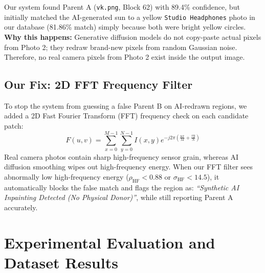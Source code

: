 \documentclass[12pt,a4paper]{article}
\begin{document}
Our system found Parent A (\texttt{vk.png}, Block 62) with 89.4\% confidence, but initially matched the AI-generated sun to a yellow \texttt{Studio Headphones} photo in our database (81.86\% match) simply because both were bright yellow circles. \textbf{Why this happens:} Generative diffusion models do not copy-paste actual pixels from Photo 2; they redraw brand-new pixels from random Gaussian noise. Therefore, no real camera pixels from Photo 2 exist inside the output image.

\subsection{Our Fix: 2D FFT Frequency Filter}
To stop the system from guessing a false Parent B on AI-redrawn regions, we added a 2D Fast Fourier Transform (FFT) frequency check on each candidate patch:
\begin{equation}
F(u, v) = \sum_{x=0}^{M-1} \sum_{y=0}^{N-1} I(x, y) e^{-j 2\pi \left(\frac{ux}{M} + \frac{vy}{N}\right)}
\end{equation}
Real camera photos contain sharp high-frequency sensor grain, whereas AI diffusion smoothing wipes out high-frequency energy. When our FFT filter sees abnormally low high-frequency energy ($\rho_{\text{HF}} < 0.88$ or $\sigma_{\text{HF}} < 14.5$), it automatically blocks the false match and flags the region as: \textit{``Synthetic AI Inpainting Detected (No Physical Donor)''}, while still reporting Parent A accurately.

\section{Experimental Evaluation and Dataset Results}
\end{document}
